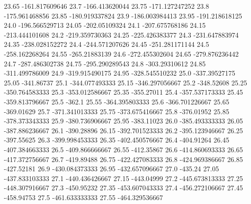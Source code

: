           23.65   -161.817609646
           23.7   -166.413620044
          23.75   -171.127247252
           23.8   -175.961468856
          23.85   -180.919337824
           23.9   -186.003984413
          23.95   -191.218618125
           24.0   -196.566529713
          24.05    -202.05109324
           24.1   -207.675768186
          24.15   -213.444101608
           24.2   -219.359730363
          24.25   -225.426383377
           24.3   -231.647883974
          24.35   -238.028152272
           24.4   -244.571207626
          24.45   -251.281171144
           24.5   -258.162268264
          24.55    -265.21883139
           24.6   -272.455302604
          24.65   -279.876236442
           24.7   -287.486302738
          24.75   -295.290289543
           24.8    -303.29310612
          24.85   -311.499786009
           24.9   -319.915490175
          24.95   -328.545510232
           25.0    -337.39527175
          25.05       -341.86737
           25.1   -344.077493333
          25.15   -346.297056667
           25.2       -348.52608
          25.25   -350.764583333
           25.3   -353.012586667
          25.35       -355.27011
           25.4   -357.537173333
          25.45   -359.813796667
           25.5           -362.1
          25.55   -364.395803333
           25.6   -366.701226667
          25.65       -369.01629
           25.7   -371.341013333
          25.75   -373.675416667
           25.8       -376.01952
          25.85   -378.373343333
           25.9   -380.736906667
          25.95       -383.11023
           26.0   -385.493333333
          26.05   -387.886236667
           26.1       -390.28896
          26.15   -392.701523333
           26.2   -395.123946667
          26.25       -397.55625
           26.3   -399.998453333
          26.35   -402.450576667
           26.4       -404.91264
          26.45   -407.384663333
           26.5   -409.866666667
          26.55       -412.35867
           26.6   -414.860693333
          26.65   -417.372756667
           26.7       -419.89488
          26.75   -422.427083333
           26.8   -424.969386667
          26.85       -427.52181
           26.9   -430.084373333
          26.95   -432.657096667
           27.0          -435.24
          27.05   -437.833103333
           27.1   -440.436426667
          27.15       -443.04999
           27.2   -445.673813333
          27.25   -448.307916667
           27.3       -450.95232
          27.35   -453.607043333
           27.4   -456.272106667
          27.45       -458.94753
           27.5   -461.633333333
          27.55   -464.329536667
